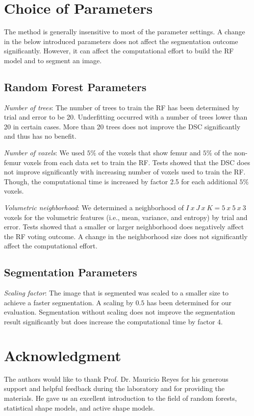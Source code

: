 \documentclass[journal]{IEEEtran}
\begin{document}
\IEEEpeerreviewmaketitle







\appendices
\section{Choice of Parameters}
\label{secAppendixA}
The method is generally insensitive to most of the parameter settings. A change in the below introduced parameters does not affect the segmentation outcome significantly. However, it can affect the computational effort to build the RF model and to segment an image.
\subsection{Random Forest Parameters}

\textit{Number of trees}: The number of trees to train the RF has been determined by trial and error to be 20. Underfitting occurred with a number of trees lower than 20 in certain cases. More than 20 trees does not improve the DSC significantly and thus has no benefit.

\textit{Number of voxels}: We used $5 \%$ of the voxels that show femur and $5 \%$ of the non-femur voxels from each data set to train the RF. Tests showed that the DSC does not improve significantly with increasing number of voxels used to train the RF. Though, the computational time is increased by factor 2.5 for each additional $5 \%$ voxels.

\textit{Volumetric neighborhood}: We determined a neighborhood of $I~x~J~x~K=5~x~5~x~3$ voxels for the volumetric features (i.e., mean, variance, and entropy) by trial and error. Tests showed that a smaller or larger neighborhood does negatively affect the RF voting outcome. A change in the neighborhood size does not significantly affect the computational effort.

\subsection{Segmentation Parameters}
\textit{Scaling factor}: The image that is segmented was scaled to a smaller size to achieve a faster segmentation. A scaling by $0.5$ has been determined for our evaluation. Segmentation without scaling does not improve the segmentation result significantly but does increase the computational time by factor 4.

\section*{Acknowledgment}
The authors would like to thank Prof. Dr. Mauricio Reyes for his generous support and helpful feedback during the laboratory and for providing the materials. He gave us an excellent introduction to the field of random forests, statistical shape models, and active shape models.

\ifCLASSOPTIONcaptionsoff
  \newpage
\fi


\end{document}
